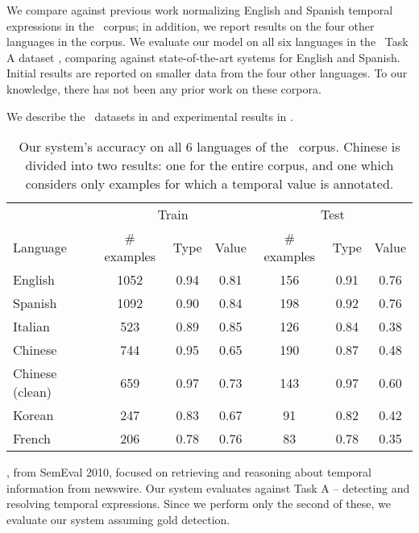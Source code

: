 We compare against previous work normalizing English and Spanish temporal
  expressions in the \tempeval\ corpus; in addition, we report results on
  the four other languages in the corpus.
We evaluate our model on all six languages in the \tempeval\ Task A dataset
  \cite{key:2010verhagen-tempeval}, comparing against state-of-the-art
  systems for English and Spanish.
Initial results are reported on smaller data from the four other languages.
To our knowledge, there has not been any prior work on these corpora.

We describe the \tempeval\ datasets in  and experimental
  results in .


\begin{table*}[ht]
	\begin{center}
	\begin{tabular}{|l|c|c|c|c|c|c|}
		\hline
		       & \multicolumn{3}{c|}{Train} & \multicolumn{3}{c|}{Test} \\
		Language & \# examples & Type & Value  & \# examples & Type & Value \\
		\hline
		\hline
		English          & 1052 & 0.94 & 0.81  & 156 & 0.91 & 0.76 \\
		Spanish          & 1092 & 0.90 & 0.84  & 198 & 0.92 & 0.76 \\
		Italian          & 523  & 0.89 & 0.85  & 126 & 0.84 & 0.38 \\
		Chinese          & 744  & 0.95 & 0.65  & 190 & 0.87 & 0.48 \\
		Chinese (clean)  & 659  & 0.97 & 0.73  & 143 & 0.97 & 0.60 \\
		Korean           & 247  & 0.83 & 0.67  & 91  & 0.82 & 0.42 \\
		French           & 206  & 0.78 & 0.76  & 83  & 0.78 & 0.35 \\
		\hline
	\end{tabular}
	\caption{
    Our system's accuracy on all 6 languages of the \tempeval\ corpus.
    Chinese is divided into two results: one for the entire corpus, and one
      which considers only examples for which a temporal value is annotated.
		\label{tab:results-all}
	}
	\end{center}
\end{table*}

\tempeval, from SemEval 2010, focused on retrieving and reasoning
  about temporal information from newswire.
Our system evaluates against Task A -- detecting and resolving temporal
  expressions.
Since we perform only the second of these, we evaluate our system
	assuming gold detection.

